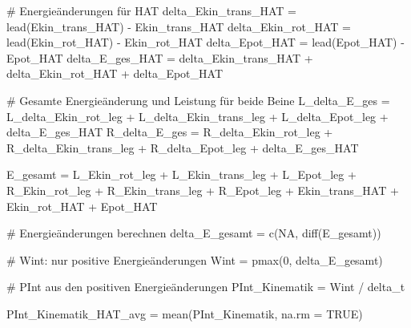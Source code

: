 \documentclass[
  letterpaper,
  DIV=11]{scrartcl}
\newenvironment{Shaded}{\begin{snugshade}}{\end{snugshade}}
\newcommand{\AttributeTok}[1]{\textcolor[rgb]{0.40,0.45,0.13}{#1}}
\newcommand{\CommentTok}[1]{\textcolor[rgb]{0.37,0.37,0.37}{#1}}
\newcommand{\ConstantTok}[1]{\textcolor[rgb]{0.56,0.35,0.01}{#1}}
\newcommand{\DecValTok}[1]{\textcolor[rgb]{0.68,0.00,0.00}{#1}}
\newcommand{\FunctionTok}[1]{\textcolor[rgb]{0.28,0.35,0.67}{#1}}
\newcommand{\NormalTok}[1]{\textcolor[rgb]{0.00,0.23,0.31}{#1}}
\newcommand{\OtherTok}[1]{\textcolor[rgb]{0.00,0.23,0.31}{#1}}
\newcommand{\SpecialCharTok}[1]{\textcolor[rgb]{0.37,0.37,0.37}{#1}}
\begin{document}
\begin{Shaded}
\begin{Highlighting}[]
\CommentTok{\# Energieänderungen für HAT}
\NormalTok{delta\_Ekin\_trans\_HAT }\OtherTok{=} \FunctionTok{lead}\NormalTok{(Ekin\_trans\_HAT) }\SpecialCharTok{{-}}\NormalTok{ Ekin\_trans\_HAT}
\NormalTok{delta\_Ekin\_rot\_HAT }\OtherTok{=} \FunctionTok{lead}\NormalTok{(Ekin\_rot\_HAT) }\SpecialCharTok{{-}}\NormalTok{ Ekin\_rot\_HAT}
\NormalTok{delta\_Epot\_HAT }\OtherTok{=} \FunctionTok{lead}\NormalTok{(Epot\_HAT) }\SpecialCharTok{{-}}\NormalTok{ Epot\_HAT}
\NormalTok{delta\_E\_ges\_HAT }\OtherTok{=}\NormalTok{ delta\_Ekin\_trans\_HAT }\SpecialCharTok{+}\NormalTok{ delta\_Ekin\_rot\_HAT }\SpecialCharTok{+}\NormalTok{ delta\_Epot\_HAT}

\CommentTok{\# Gesamte Energieänderung und Leistung für beide Beine}
\NormalTok{L\_delta\_E\_ges }\OtherTok{=}\NormalTok{ L\_delta\_Ekin\_rot\_leg }\SpecialCharTok{+}\NormalTok{ L\_delta\_Ekin\_trans\_leg }\SpecialCharTok{+}\NormalTok{ L\_delta\_Epot\_leg }\SpecialCharTok{+}\NormalTok{ delta\_E\_ges\_HAT}
\NormalTok{R\_delta\_E\_ges }\OtherTok{=}\NormalTok{ R\_delta\_Ekin\_rot\_leg }\SpecialCharTok{+}\NormalTok{ R\_delta\_Ekin\_trans\_leg }\SpecialCharTok{+}\NormalTok{ R\_delta\_Epot\_leg }\SpecialCharTok{+}\NormalTok{ delta\_E\_ges\_HAT}

\NormalTok{E\_gesamt }\OtherTok{=}\NormalTok{ L\_Ekin\_rot\_leg }\SpecialCharTok{+}\NormalTok{ L\_Ekin\_trans\_leg }\SpecialCharTok{+}\NormalTok{ L\_Epot\_leg }\SpecialCharTok{+}
\NormalTok{R\_Ekin\_rot\_leg }\SpecialCharTok{+}\NormalTok{ R\_Ekin\_trans\_leg }\SpecialCharTok{+}\NormalTok{ R\_Epot\_leg }\SpecialCharTok{+}
\NormalTok{Ekin\_trans\_HAT }\SpecialCharTok{+}\NormalTok{ Ekin\_rot\_HAT }\SpecialCharTok{+}\NormalTok{ Epot\_HAT}

\CommentTok{\# Energieänderungen berechnen}
\NormalTok{delta\_E\_gesamt }\OtherTok{=} \FunctionTok{c}\NormalTok{(}\ConstantTok{NA}\NormalTok{, }\FunctionTok{diff}\NormalTok{(E\_gesamt))}

\CommentTok{\# Wint: nur positive Energieänderungen}
\NormalTok{Wint }\OtherTok{=} \FunctionTok{pmax}\NormalTok{(}\DecValTok{0}\NormalTok{, delta\_E\_gesamt)}

\CommentTok{\# PInt aus den positiven Energieänderungen}
\NormalTok{PInt\_Kinematik }\OtherTok{=}\NormalTok{ Wint }\SpecialCharTok{/}\NormalTok{ delta\_t}

\NormalTok{PInt\_Kinematik\_HAT\_avg }\OtherTok{=} \FunctionTok{mean}\NormalTok{(PInt\_Kinematik, }\AttributeTok{na.rm =} \ConstantTok{TRUE}\NormalTok{)}
\end{Highlighting}
\end{Shaded}
\end{document}
